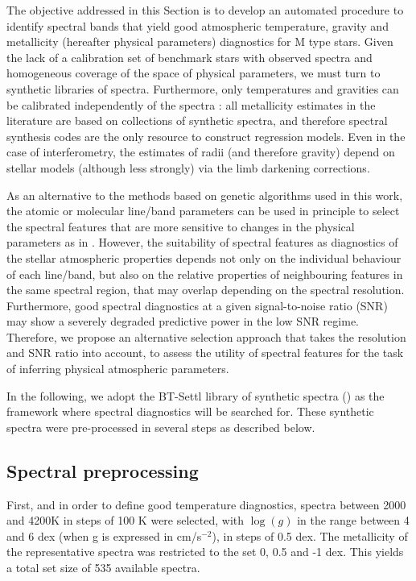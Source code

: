 The objective addressed in this Section is to develop an automated
procedure to identify spectral bands that yield good atmospheric
temperature, gravity and metallicity (hereafter physical parameters)
diagnostics for M type stars. Given the lack of a calibration set of
benchmark stars with observed spectra and homogeneous coverage of the
space of physical parameters, we must turn to synthetic libraries of
spectra. Furthermore, only temperatures and gravities can be
calibrated independently of the spectra \citep[for example as
in][using interferometry]{2003A&A...397L...5S}: all metallicity
estimates in the literature are based on collections of synthetic
spectra, and therefore spectral synthesis codes are the only resource
to construct regression models. Even in the case of interferometry,
the estimates of radii (and therefore gravity) depend on stellar
models (although less strongly) via the limb darkening corrections.

As an alternative to the methods based on genetic algorithms used in
this work, the atomic or molecular line/band parameters can be used in
principle to select the spectral features that are more sensitive to
changes in the physical parameters as
in \cite{2016A&A...587A..19P}. However, the suitability of spectral
features as diagnostics of the stellar atmospheric properties depends
not only on the individual behaviour of each line/band, but also on
the relative properties of neighbouring features in the same spectral
region, that may overlap depending on the spectral
resolution. Furthermore, good spectral diagnostics at a given
signal-to-noise ratio (SNR) may show a severely degraded predictive
power in the low SNR regime. Therefore, we propose an alternative
selection approach that takes the resolution and SNR ratio into
account, to assess the utility of spectral features for the task of
inferring physical atmospheric parameters. 

In the following, we adopt the BT-Settl library of synthetic spectra
(\cite{2013MSAIS..24..128A}) as the framework where spectral
diagnostics will be searched for. These synthetic spectra were
pre-processed in several steps as described below.

\subsection{Spectral preprocessing}

First, and in order to define good temperature diagnostics, spectra
between 2000 and 4200K in steps of 100 K were selected, with $\log(g)$
in the range between 4 and 6 dex (when g is expressed in cm/s$^{-2}$),
in steps of 0.5 dex. The metallicity of the representative spectra was
restricted to the set 0, 0.5 and -1 dex.  This yields a total set size
of 535 available spectra.

